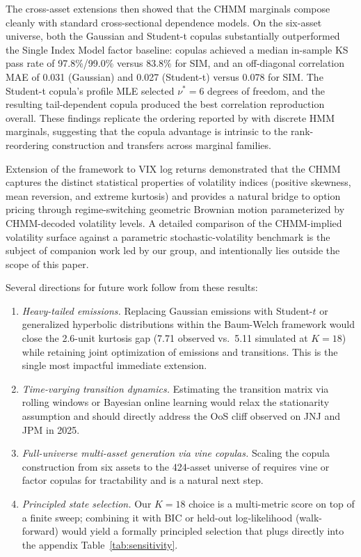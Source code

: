The cross-asset extensions then showed that the CHMM marginals compose cleanly with standard cross-sectional dependence models.
On the six-asset universe, both the Gaussian and Student-t copulas substantially outperformed the Single Index Model factor baseline: copulas achieved a median in-sample KS pass rate of 97.8\%/99.0\% versus 83.8\% for SIM, and an off-diagonal correlation MAE of 0.031 (Gaussian) and 0.027 (Student-t) versus 0.078 for SIM.
The Student-t copula's profile MLE selected $\nu^* = 6$ degrees of freedom, and the resulting tail-dependent copula produced the best correlation reproduction overall.
These findings replicate the ordering reported by \citet{alswaidan2026hybrid} with discrete HMM marginals, suggesting that the copula advantage is intrinsic to the rank-reordering construction and transfers across marginal families.

Extension of the framework to VIX log returns demonstrated that the CHMM captures the distinct statistical properties of volatility indices (positive skewness, mean reversion, and extreme kurtosis) and provides a natural bridge to option pricing through regime-switching geometric Brownian motion parameterized by CHMM-decoded volatility levels.
A detailed comparison of the CHMM-implied volatility surface against a parametric stochastic-volatility benchmark is the subject of companion work led by our group, and intentionally lies outside the scope of this paper.

Several directions for future work follow from these results:
\begin{enumerate}
    \item \textit{Heavy-tailed emissions.}
    Replacing Gaussian emissions with Student-$t$ or generalized hyperbolic distributions within the Baum-Welch framework would close the 2.6-unit kurtosis gap (7.71 observed vs.\ 5.11 simulated at $K = 18$) while retaining joint optimization of emissions and transitions.
    This is the single most impactful immediate extension.

    \item \textit{Time-varying transition dynamics.}
    Estimating the transition matrix via rolling windows or Bayesian online learning would relax the stationarity assumption and should directly address the OoS cliff observed on JNJ and JPM in 2025.

    \item \textit{Full-universe multi-asset generation via vine copulas.}
    Scaling the copula construction from six assets to the 424-asset universe of \citet{alswaidan2026hybrid} requires vine or factor copulas for tractability and is a natural next step.

    \item \textit{Principled state selection.}
    Our $K = 18$ choice is a multi-metric score on top of a finite sweep; combining it with BIC or held-out log-likelihood (walk-forward) would yield a formally principled selection that plugs directly into the appendix Table~\ref{tab:sensitivity}.
\end{enumerate}

